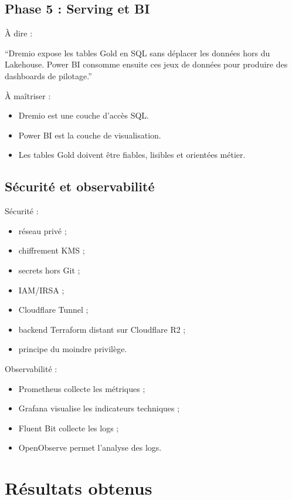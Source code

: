 \documentclass[11pt,a4paper]{article}
\newcommand{\important}[1]{%
  \vspace{0.25cm}
  \noindent
  \colorbox{softblue}{%
    \parbox{\dimexpr\textwidth-2\fboxsep\relax}{#1}%
  }
  \vspace{0.2cm}
}
\begin{document}
\subsection{Phase 5 : Serving et BI}

À dire :

\important{
``Dremio expose les tables Gold en SQL sans déplacer les données hors du Lakehouse. Power BI consomme ensuite ces jeux de données pour produire des dashboards de pilotage.''
}

À maîtriser :
\begin{itemize}
  \item Dremio est une couche d'accès SQL.
  \item Power BI est la couche de visualisation.
  \item Les tables Gold doivent être fiables, lisibles et orientées métier.
\end{itemize}

\subsection{Sécurité et observabilité}

Sécurité :
\begin{itemize}
  \item réseau privé ;
  \item chiffrement KMS ;
  \item secrets hors Git ;
  \item IAM/IRSA ;
  \item Cloudflare Tunnel ;
  \item backend Terraform distant sur Cloudflare R2 ;
  \item principe du moindre privilège.
\end{itemize}

Observabilité :
\begin{itemize}
  \item Prometheus collecte les métriques ;
  \item Grafana visualise les indicateurs techniques ;
  \item Fluent Bit collecte les logs ;
  \item OpenObserve permet l'analyse des logs.
\end{itemize}

\section{Résultats obtenus}
\end{document}

